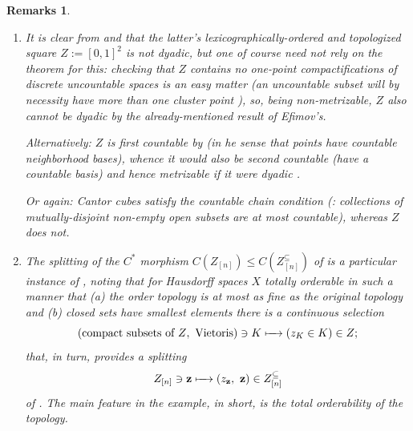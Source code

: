 \documentclass[11pt,leqno]{article}
\theoremstyle{plain}
\theoremstyle{plain}
\theoremstyle{plain}
\newtheorem{remarks}[lemma]{Remarks}
\numberwithin{equation}{section}
\theoremstyle{nonumberplain}
\newcommand\1{{\bf 1}}
\begin{document}
\begin{remarks}\label{res:ordrbl}
  \begin{enumerate}[(1),wide]
  \item\label{item:res:ordrbl:lex.not.dy} It is clear from  and  that the latter's lexicographically-ordered and topologized square $Z:=[0,1]^2$ is not dyadic, but one of course need not rely on the theorem for this: checking that $Z$ contains no one-point compactifications of discrete uncountable spaces is an easy matter (an uncountable subset will by necessity have more than one {\it cluster point} \cite[Definition 4.9]{wil_top}), so, being non-metrizable, $Z$ also cannot be dyadic by the already-mentioned result \cite[Proof of Theorem 4]{zbMATH03209749} of Efimov's.

    Alternatively: $Z$ is {\it first countable} by \cite[Example 48 4.]{ss_countertop} (in he sense \cite[p.7]{ss_countertop} that points have countable neighborhood bases), whence it would also be {\it second} countable (have a countable basis) and hence \cite[Theorem 34.1]{mnk} metrizable if it were dyadic \cite[Theorem 4]{zbMATH03222595}.

    Or again: Cantor cubes satisfy the {\it countable chain condition} (\cite[Chapter 5, Problem O(f)]{kel-top}: collections of mutually-disjoint non-empty open subsets are at most countable), whereas $Z$ does not.

  \item\label{item:res:ordrbl:mich.ord} The splitting of the $C^*$ morphism $C\left(Z_{[n]}\right)\le C\left(Z^{\subseteq}_{[n]}\right)$ of  is a particular instance of \cite[Theorem 1.9]{zbMATH03067268}, noting that for Hausdorff spaces $X$ totally orderable in such a manner that (a) the order topology is at most as fine as the original topology and (b) closed sets have smallest elements there is a continuous selection
    \begin{equation*}
      \left(\text{compact subsets of $Z$},\ \text{Vietoris}\right)
      \ni K
      \xmapsto{\quad}
      \left(z_K\in K\right)
      \in Z;
    \end{equation*}
    that, in turn, provides a splitting
    \begin{equation*}
      Z_{[n]}\ni {\bf z}
      \xmapsto{\quad}
      (z_{\bf z},\ {\bf z})
      \in
      Z_{[n]}^{\subseteq}
    \end{equation*}
    of . The main feature in the example, in short, is the total orderability of the topology.
  \end{enumerate}
\end{remarks}
\end{document}
